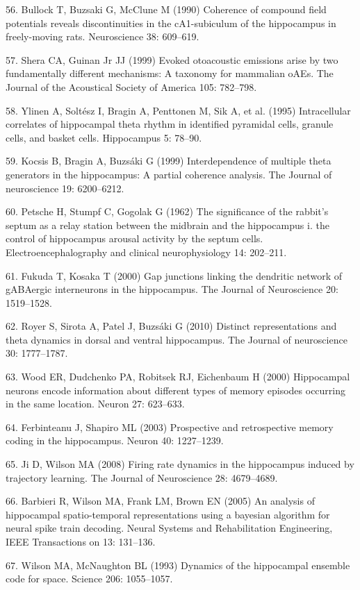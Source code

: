\documentclass[]{article}
\begin{document}
56. Bullock T, Buzsaki G, McClune M (1990) Coherence of compound field
potentials reveals discontinuities in the cA1-subiculum of the
hippocampus in freely-moving rats. Neuroscience 38: 609--619.

57. Shera CA, Guinan Jr JJ (1999) Evoked otoacoustic emissions arise by
two fundamentally different mechanisms: A taxonomy for mammalian oAEs.
The Journal of the Acoustical Society of America 105: 782--798.

58. Ylinen A, Solt{é}sz I, Bragin A, Penttonen M, Sik A, et al. (1995)
Intracellular correlates of hippocampal theta rhythm in identified
pyramidal cells, granule cells, and basket cells. Hippocampus 5: 78--90.

59. Kocsis B, Bragin A, Buzs{á}ki G (1999) Interdependence of multiple
theta generators in the hippocampus: A partial coherence analysis. The
Journal of neuroscience 19: 6200--6212.

60. Petsche H, Stumpf C, Gogolak G (1962) The significance of the
rabbit's septum as a relay station between the midbrain and the
hippocampus i. the control of hippocampus arousal activity by the septum
cells. Electroencephalography and clinical neurophysiology 14: 202--211.

61. Fukuda T, Kosaka T (2000) Gap junctions linking the dendritic
network of gABAergic interneurons in the hippocampus. The Journal of
Neuroscience 20: 1519--1528.

62. Royer S, Sirota A, Patel J, Buzs{á}ki G (2010) Distinct
representations and theta dynamics in dorsal and ventral hippocampus.
The Journal of neuroscience 30: 1777--1787.

63. Wood ER, Dudchenko PA, Robitsek RJ, Eichenbaum H (2000) Hippocampal
neurons encode information about different types of memory episodes
occurring in the same location. Neuron 27: 623--633.

64. Ferbinteanu J, Shapiro ML (2003) Prospective and retrospective
memory coding in the hippocampus. Neuron 40: 1227--1239.

65. Ji D, Wilson MA (2008) Firing rate dynamics in the hippocampus
induced by trajectory learning. The Journal of Neuroscience 28:
4679--4689.

66. Barbieri R, Wilson MA, Frank LM, Brown EN (2005) An analysis of
hippocampal spatio-temporal representations using a bayesian algorithm
for neural spike train decoding. Neural Systems and Rehabilitation
Engineering, IEEE Transactions on 13: 131--136.

67. Wilson MA, McNaughton BL (1993) Dynamics of the hippocampal ensemble
code for space. Science 206: 1055--1057.
\end{document}
